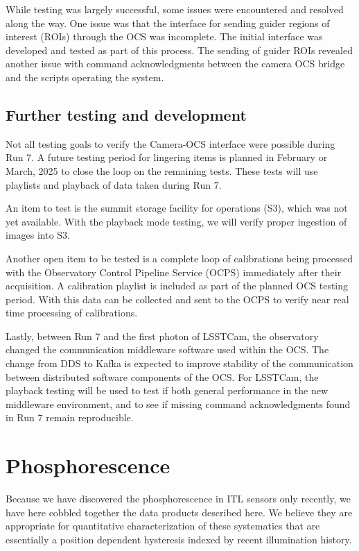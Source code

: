 While testing was largely successful, some issues were encountered and resolved along the way. One issue was that the interface for sending guider regions of interest (ROIs) through the OCS was incomplete. The initial interface was developed and tested as part of this process. The sending of guider ROIs revealed another issue with command acknowledgments between the camera OCS bridge and the scripts operating the system.  


\subsection{Further testing and development}
Not all testing goals to verify the Camera-OCS interface were possible during Run 7. A future testing period for lingering items is planned in February or March, 2025 to close the loop on the remaining tests. These tests will use playlists and playback of data taken during Run 7.

An item to test is the summit storage facility for operations (S3), which was not yet available. With the playback mode testing, we will verify proper ingestion of images into S3.

Another open item to be tested is a complete loop of calibrations being processed with the Observatory Control Pipeline Service (OCPS) immediately after their acquisition. A calibration playlist is included as part of the planned OCS testing period. With this data can be collected and sent to the OCPS to verify near real time processing of calibrations.

Lastly, between Run 7 and the first photon of LSSTCam, the observatory changed the communication middleware software used within the OCS. The change from DDS to Kafka is expected to improve stability of the communication between distributed software components of the OCS. For LSSTCam, the playback testing will be used to test if both general performance in the new middleware environment, and to see if missing command acknowledgments found in Run 7 remain reproducible. 

\clearpage
\section{Phosphorescence}\label{appendix:phosphorescence}
Because we have discovered the phosphorescence in ITL sensors only recently, we have here cobbled together the data products described here. We believe they are appropriate for quantitative characterization of these systematics that are essentially a position dependent hysteresis indexed by recent illumination history. 


